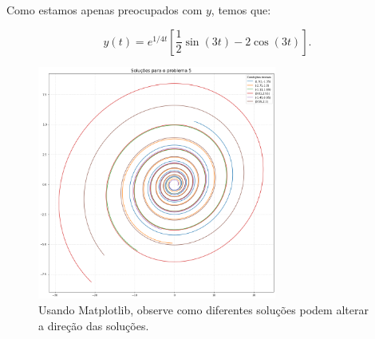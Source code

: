 \documentclass[a4paper,12pt]{article}
\theoremstyle{exer}
\theoremstyle{definition}
\begin{document}
Como estamos apenas preocupados com $y$, temos que: 

$$y(t) = e^{1/4t}\left[\frac{1}{2}\sin(3t) - 2\cos(3t)\right].$$

\begin{figure}[!hb]
    \centering
    \includegraphics[width=0.7\textwidth]{images/exercise5.png}
    \caption{Usando Matplotlib, observe como diferentes soluções podem alterar a direção das soluções.}
\end{figure}
\end{document}
